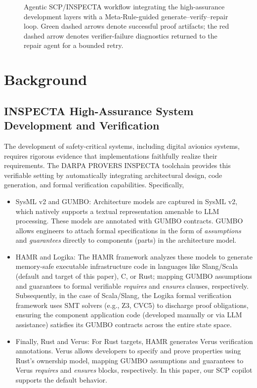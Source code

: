 \documentclass[conference]{IEEEtran}
\begin{document}
\begin{figure}[!t]
\centering
\resizebox{0.96\textwidth}{!}{}
\caption{Agentic SCP/INSPECTA workflow integrating the high-assurance development layers with a Meta-Rule-guided generate--verify--repair loop. Green dashed arrows denote successful proof artifacts; the red dashed arrow denotes verifier-failure diagnostics returned to the repair agent for a bounded retry.}
\label{fig:agentic-inspecta}
\vspace{-0.4em}
\end{figure}

\section{Background}
\label{sec:background}

\subsection{INSPECTA High-Assurance System Development and Verification}
\label{sec:gumbo}

The development of safety-critical systems, including digital avionics systems, requires rigorous evidence that implementations faithfully realize their requirements. The DARPA PROVERS INSPECTA toolchain provides this verifiable setting by automatically integrating architectural design, code generation, and formal verification capabilities. Specifically, 
\begin{itemize}
\item SysML v2 and GUMBO: Architecture models are captured in SysML v2, which natively supports a textual representation amenable to LLM processing. These models are annotated with GUMBO contracts. GUMBO allows engineers to attach formal specifications in the form of \textit{assumptions} and \textit{guarantees} directly to components (parts) in the architecture model.

\item HAMR and Logika: The HAMR framework analyzes these models to generate memory-safe executable infrastructure code in languages like Slang/Scala (default and target of this paper), C, or Rust; mapping GUMBO assumptions and guarantees to formal verifiable \textit{requires} and \textit{ensures} clauses, respectively. Subsequently, in the case of Scala/Slang, the Logika formal verification framework uses SMT solvers (e.g., Z3, CVC5) to discharge proof obligations, ensuring the component application code (developed manually or via LLM assistance) satisfies its GUMBO contracts across the entire state space.

\item Finally, Rust and Verus: For Rust targets, HAMR generates Verus verification annotations. Verus allows developers to specify and prove properties using Rust’s ownership model, mapping GUMBO assumptions and guarantees to Verus \textit{requires} and \textit{ensures} blocks, respectively. In this paper, our SCP copilot supports the default behavior. 
\end{itemize}
\end{document}
